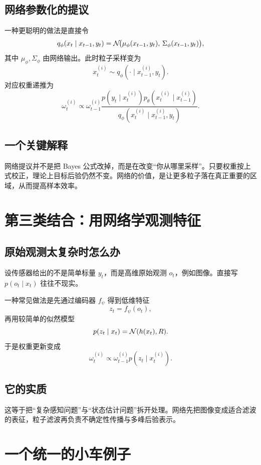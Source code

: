 \documentclass[12pt,a4paper]{ctexart}
\begin{document}
\subsection{网络参数化的提议}

一种更聪明的做法是直接令
\[
q_\phi(x_t \mid x_{t-1}, y_t)
= \mathcal{N}\!\bigl(\mu_\phi(x_{t-1}, y_t),\, \Sigma_\phi(x_{t-1}, y_t)\bigr),
\]
其中 \(\mu_\phi,\Sigma_\phi\) 由网络输出。此时粒子采样变为
\[
x_t^{(i)} \sim q_\phi(\cdot \mid x_{t-1}^{(i)}, y_t).
\]
对应权重递推为
\[
\omega_t^{(i)}
\propto \omega_{t-1}^{(i)}
\frac{p(y_t \mid x_t^{(i)}) p_\theta(x_t^{(i)} \mid x_{t-1}^{(i)})}
{q_\phi(x_t^{(i)} \mid x_{t-1}^{(i)}, y_t)}.
\]

\subsection{一个关键解释}

网络提议并不是把 Bayes 公式改掉，而是在改变“你从哪里采样”。只要权重按上式校正，理论上目标后验仍然不变。网络的价值，是让更多粒子落在真正重要的区域，从而提高样本效率。

\section{第三类结合：用网络学观测特征}

\subsection{原始观测太复杂时怎么办}

设传感器给出的不是简单标量 \(y_t\)，而是高维原始观测 \(o_t\)，例如图像。直接写 \(p(o_t \mid x_t)\) 往往不现实。

一种常见做法是先通过编码器 \(f_\psi\) 得到低维特征
\[
z_t = f_\psi(o_t),
\]
再用较简单的似然模型
\[
p(z_t \mid x_t) = \mathcal{N}(h(x_t), R).
\]
于是权重更新变成
\[
\omega_t^{(i)} \propto \omega_{t-1}^{(i)} p(z_t \mid x_t^{(i)}).
\]

\subsection{它的实质}

这等于把“复杂感知问题”与“状态估计问题”拆开处理。网络先把图像变成适合滤波的表征，粒子滤波再负责不确定性传播与多峰后验表示。

\section{一个统一的小车例子}
\end{document}
